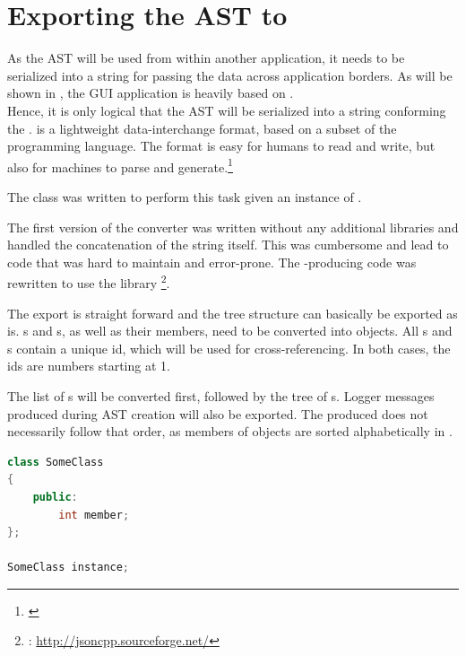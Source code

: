 \section{Exporting the AST to }
\label{sec:ExportJSON}

As the AST will be used from within another application, it needs to be serialized into a string for passing the data across application borders. As will be shown in , the GUI application is heavily based on .\\
Hence, it is only logical that the AST will be serialized into a string conforming the .   is a lightweight data-interchange format, based on a subset of the  programming language. The format is easy for humans to read and write, but also for machines to parse and generate.\footnote{\citep{JSONHP}}

The class  was written to perform this task given an instance of \linebreak{}.

The first version of the converter was written without any additional libraries and handled the concatenation of the  string itself. This was cumbersome and lead to code that was hard to maintain and error-prone. The -producing code was rewritten to use the library \footnote{: \url{http://jsoncpp.sourceforge.net/}}.

The export is straight forward and the tree structure can basically be exported as is. s and s, as well as their members, need to be converted into  objects. All s and s contain a unique id, which will be used for cross-referencing. In both cases, the ids are numbers starting at 1.

The list of s will be converted first, followed by the tree of s. Logger messages produced during AST creation will also be exported. The produced  does not necessarily follow that order, as members of  objects are sorted alphabetically in .

\SingleSpacing
\begin{lstlisting}[language=C++, caption=Example AST for \myProperName{JSON} conversion]
class SomeClass
{
	public:
		int member;
};

SomeClass instance;
\end{lstlisting}
\OnehalfSpacing

